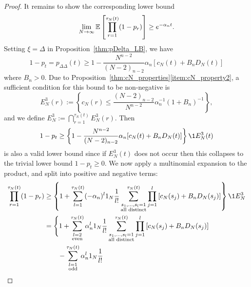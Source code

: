 \begin{proof}
It remains to show the corresponding lower bound
\begin{equation*}
    \lim_{N\to\infty} \mathbb{E}\left[ \prod_{r=1}^{\tau_N(t)} (1-p_r) \right] 
\geq e^{-\alpha_n t} .
\end{equation*}
Setting $\xi=\Delta$ in Proposition~\ref{thm:pDelta_LB}, we have
\begin{equation}\label{eq:pDeltaDelta_LB}
1-p_t
= p_{\Delta\Delta}(t) \geq 1 - \frac{N^{n-2}}{(N-2)_{n-2}} \alpha_n 
    [ c_N(t) + B_n D_N(t) ] 
\end{equation}
where $B_n >0$.
Due to Proposition~\ref{thm:cN_properties}\eqref{item:cN_property2}, a sufficient condition for this bound to be non-negative is
\begin{equation}\label{eq:defn_E3}
E_N^3(r)
:= \left\{ c_N(r) \leq \frac{(N-2)_{n-2}}{N^{n-2}} 
        \alpha_n^{-1} (1+B_n)^{-1} \right\} ,
\end{equation}
and we define $E_N^3 := \bigcap_{r=1}^{\tau_N(t)} E_N^3(r)$. 
Then
\begin{equation*}
1-p_t
\geq \left\{ 1 - \frac{N^{n-2}}{(N-2)_{n-2}} \alpha_n 
    [ c_N(t) + B_n D_N(t) ] \right\} \1{E_N^3(t)}
\end{equation*}
is also a valid lower bound since if $E_N^3(t)$ does not occur then this collapses to the trivial lower bound $1-p_t \geq 0$.
We now apply a multinomial expansion to the product, and split into positive and negative terms:
\begin{align*}
\prod_{r=1}^{\tau_N(t)} (1-p_r)
&\geq \left\{ 1 + \sum_{l=1}^{\tau_N(t)} (-\alpha_n)^l \ON 
        \frac{1}{l!} \sum_{\substack{ s_1, \dots, s_l =1 \\ \text{all distinct} }}^{\tau_N(t)}
        \prod_{j=1}^l
        \left[ c_N(s_j) + B_n D_N(s_j) \right] \right\} \1{E_N^3} \\
&= \Bigg\{ 1 + \sum_{\substack{l=2 \\ \text{even} }}^{\tau_N(t)} 
        \alpha_n^l \ON \frac{1}{l!} 
        \sum_{\substack{ s_1, \dots, s_l =1 \\ \text{all distinct} }}^{\tau_N(t)}
        \prod_{j=1}^l
        \left[ c_N(s_j) + B_n D_N(s_j) \right] \\
    &\qquad- \sum_{\substack{l=1 \\ \text{odd} }}^{\tau_N(t)} 
        \alpha_n^l \ON \frac{1}{l!}

\end{align*}
\end{proof}
